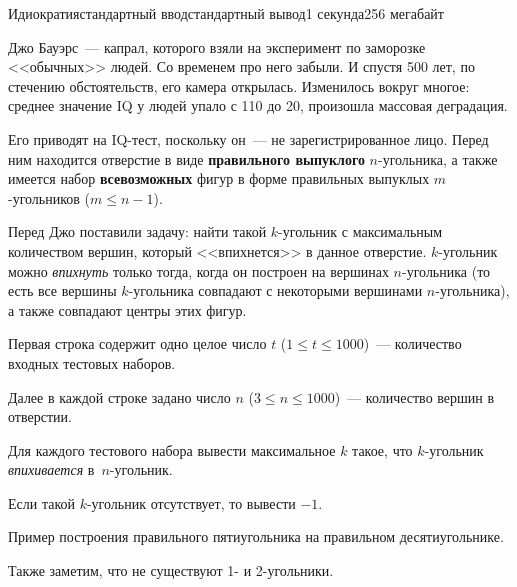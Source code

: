 \begin{problem}{Идиократия}{стандартный ввод}{стандартный вывод}{1 секунда}{256 мегабайт}

Джо Бауэрс~--- капрал, которого взяли на эксперимент по заморозке <<обычных>> людей. Со временем про него забыли. И спустя 500 лет, по стечению обстоятельств, его камера открылась. Изменилось вокруг многое: среднее значение IQ у людей упало с 110 до 20, произошла массовая деградация.

Его приводят на IQ-тест, поскольку он~--- не зарегистрированное лицо. Перед ним находится отверстие в виде \textbf{правильного выпуклого} $n$-угольника, а также имеется набор \textbf{всевозможных} фигур в форме правильных выпуклых $m$-угольников ($m \le n - 1$). 

Перед Джо поставили задачу: найти такой $k$-угольник с максимальным количеством вершин, который <<впихнется>> в данное отверстие. $k$-угольник можно \textit{впихнуть} только тогда, когда он построен на вершинах $n$-угольника (то есть все вершины $k$-угольника совпадают с некоторыми вершинами $n$-угольника), а также совпадают центры этих фигур.

\InputFile
Первая строка содержит одно целое число $t$ ($1 \le t \le 1000$)~--- количество входных тестовых наборов.

Далее в каждой строке задано число $n$ ($3 \le n \le 1000$)~--- количество вершин в отверстии.

\OutputFile
Для каждого тестового набора вывести максимальное $k$ такое, что $k$-угольник \textit{впихивается} в~$n$-угольник.

Если такой $k$-угольник отсутствует, то вывести $-1$.



\Example

\begin{example}
%
\end{example}

\Note
\centerline{}

Пример построения правильного пятиугольника на правильном десятиугольнике.

Также заметим, что не существуют 1- и 2-угольники.

\end{problem}

